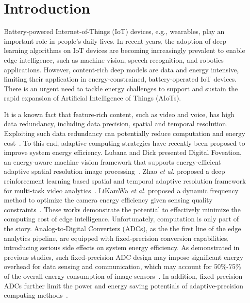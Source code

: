 \section{Introduction}

Battery-powered Internet-of-Things (IoT) devices, e.g., wearables, play an important role in people's daily lives.
In recent years, the adoption of deep learning algorithms on IoT devices are becoming increasingly prevalent to enable edge
intelligence, such as machine vision, speech recognition, and robotics applications. However, content-rich deep models are data 
and energy intensive, limiting their application in energy-constrained, battery-operated IoT devices. There is an urgent need to 
tackle energy challenges to support and sustain the rapid expansion of Artificial Intelligence of Things (AIoTs).

It is a known fact that feature-rich content, such as video and voice, has high data redundancy, including data precision, spatial
and temporal resolution. Exploiting such data redundancy
can potentially reduce computation and energy cost~\cite{lubana_digital_2018, zhao_reinforcement-learning-based_2022}. 
To this end, adaptive computing strategies have recently been proposed to improve system energy efficiency. 
Lubana and Dick presented Digital Foveation, an energy-aware machine vision framework that supports energy-efficient adaptive spatial resolution image processing~\cite{lubana_digital_2018}. 
Zhao {\it et al.} proposed a deep reinforcement learning based spatial and temporal adaptive resolution framework for multi-task video analytics~\cite{zhao_reinforcement-learning-based_2022}. 
LiKamWa {\it et al.} proposed a dynamic frequency method to optimize the camera energy efficiency given sensing quality constraints~\cite{likamwa_energy_2013}. These works demonstrate the potential to effectively minimize the computing cost of edge intelligence. 
Unfortunately, computation is only part of the story. Analog-to-Digital Converters (ADCs), as the the first line of the edge 
analytics pipeline, are equipped with fixed-precision conversion capabilities, introducing serious side effects on system energy 
efficiency.  As demonstrated in previous studies, such fixed-precision ADC design may impose significant energy overhead for
data sensing and communication, which may account for 50\%-75\% of the overall energy consumption of 
image sensors~\cite{choi_energyillumination-adaptive_2015,takayanagi_125-inch_2005,kitamura_33-megapixel_2012}. 
In addition, fixed-precision ADCs further limit the power and energy saving potentials of adaptive-precision computing methods~\cite{leibe_xnor-net_2016,li_ternary_2016,park_energy-efficient_2018}.

